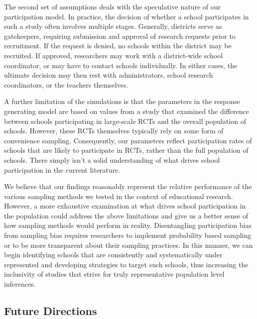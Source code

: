 \documentclass[man,floatsintext]{apa6}
\begin{document}
The second set of assumptions deals with the speculative nature of our participation model. In practice, the decision of whether a school participates in such a study often involves multiple stages. Generally, districts serve as gatekeepers, requiring submission and approval of research requests prior to recruitment. If the request is denied, no schools within the district may be recruited. If approved, researchers may work with a district-wide school coordinator, or may have to contact schools individually. In either cases, the ultimate decision may then rest with administrators, school research coordinators, or the teachers themselves.

A further limitation of the simulations is that the parameters in the response generating model are based on values from a study that examined the difference between schools participating in large-scale RCTs and the overall population of schools. However, these RCTs themselves typically rely on some form of convenience sampling. Consequently, our parameters reflect participation rates of schools that are likely to participate in RCTs, rather than the full population of schools. There simply isn't a solid understanding of what drives school participation in the current literature.

We believe that our findings reasonably represent the relative performance of the various sampling methods we tested in the context of educational research. However, a more exhaustive examination at what drives school participation in the population could address the above limitations and give us a better sense of how sampling methods would perform in reality. Disentangling participation bias from sampling bias requires researchers to implement probability based sampling or to be more transparent about their sampling practices. In this manner, we can begin identifying schools that are consistently and systematically under represented and developing strategies to target such schools, thus increasing the inclusivity of studies that strive for truly representative population level inferences.

\hypertarget{future-directions}{%
\subsection{Future Directions}\label{future-directions}}
\end{document}
